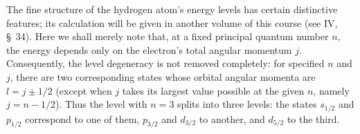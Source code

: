 The fine structure of the hydrogen atom's energy levels has certain distinctive features; its calculation will be given in another volume of this course (see IV, \S~34). Here we shall merely note that, at a fixed principal quantum number $n$, the energy depends only on the electron's total angular momentum $j$. Consequently, the level degeneracy is not removed completely: for specified $n$ and $j$, there are two corresponding states whose orbital angular momenta are $l=j\pm1/2$ (except when $j$ takes its largest value possible at the given $n$, namely $j=n-1/2$). Thus the level with $n=3$ splits into three levels: the states $s_{1/2}$ and $p_{1/2}$ correspond to one of them, $p_{3/2}$ and $d_{3/2}$ to another, and $d_{5/2}$ to the third.
